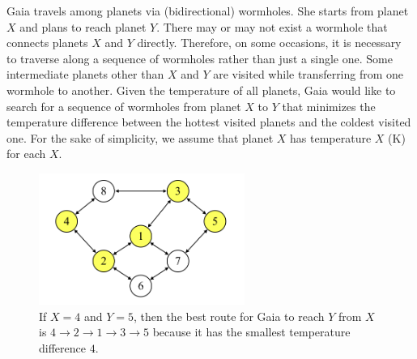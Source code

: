 Gaia travels among planets via (bidirectional) wormholes. She starts from planet $X$ and plans to reach planet $Y$. There may or may not exist a wormhole that connects planets $X$ and $Y$ directly. Therefore, on some occasions, it is necessary to traverse along a sequence of wormholes rather than just a single one. Some intermediate planets other than $X$ and $Y$ are visited while transferring from one wormhole to another. Given the temperature of all planets, Gaia would like to search for a sequence of wormholes from planet $X$ to $Y$ that minimizes the temperature difference between the hottest visited planets and the coldest visited one. For the sake of simplicity, we assume that planet $X$ has temperature $X$ (K) for each $X$. 

\begin{figure}[!h]
\centering
\includegraphics[width=0.6\textwidth]{image/D-fig1.png}
\caption{If $X = 4$ and $Y = 5$, then the best route for Gaia to reach $Y$ from $X$ is $4 \rightarrow 2 \rightarrow 1 \rightarrow 3 \rightarrow 5$ because it has the smallest temperature difference $4$. \label{fig:drawing}}
\end{figure}
